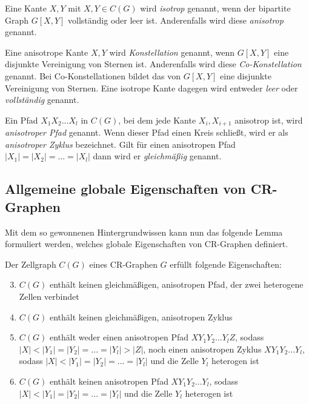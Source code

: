 \begin{Definition}
	Eine Kante ${X,Y}$ mit $X,Y\in C(G)$ wird \emph{isotrop} genannt, wenn der bipartite Graph $G[X,Y]$ vollständig oder leer ist. Anderenfalls wird diese \emph{anisotrop} genannt.
\end{Definition}

\begin{Definition}
	Eine anisotrope Kante ${X,Y}$ wird \emph{Konstellation} genannt, wenn $G[X,Y]$ eine disjunkte Vereinigung von Sternen ist.
	Anderenfalls wird diese \emph{Co-Konstellation} genannt.
	Bei Co-Konstellationen bildet das  von $G[X,Y]$ eine disjunkte Vereinigung von Sternen.
	Eine isotrope Kante dagegen wird entweder \emph{leer} oder \emph{vollständig} genannt.
\end{Definition}

\begin{Definition}
	 Ein Pfad $X_1X_2...X_l$ in $C(G)$, bei dem jede Kante ${X_i,X_{i+1}}$ anisotrop ist, wird \emph{anisotroper Pfad} genannt. Wenn dieser Pfad einen Kreis schließt, wird er als \emph{anisotroper Zyklus} bezeichnet. Gilt für einen anisotropen Pfad $|X_1|=|X_2|=...=|X_l|$ dann wird er \emph{gleichmäßig} genannt.
\end{Definition}

\subsection{Allgemeine globale Eigenschaften von CR-Graphen}
Mit dem so gewonnenen Hintergrundwissen kann nun das folgende Lemma formuliert werden, welches globale Eigenschaften von CR-Graphen definiert.

\begin{Lemma}
	Der Zellgraph $C(G)$ eines CR-Graphen $G$ erfüllt folgende Eigenschaften:

	\begin{enumerate}[label=(\Alph*)]
		\setcounter{enumi}{2}
		\item $C(G)$ enthält keinen gleichmäßigen, anisotropen Pfad, der zwei heterogene Zellen verbindet
		\item $C(G)$ enthält keinen gleichmäßigen, anisotropen Zyklus
		\item $C(G)$ enthält weder einen anisotropen Pfad $XY_1Y_2...Y_lZ$, sodass $|X|<|Y_1|=|Y_2|=...=|Y_l|>|Z|$, noch einen anisotropen Zyklus $XY_1Y_2...Y_l$, sodass $|X|<|Y_1|=|Y_2|=...=|Y_l|$ und die Zelle $Y_l$ heterogen ist
		\item $C(G)$ enthält keinen anisotropen Pfad $XY_1Y_2...Y_l$, sodass $|X|<|Y_1|=|Y_2|=...=|Y_l|$ und die Zelle $Y_l$ heterogen ist
	\end{enumerate}
	\label{lemma:global1}
\end{Lemma}

